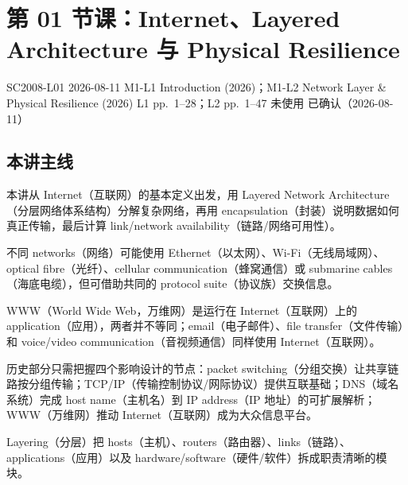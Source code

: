 
\section{第 01 节课：Internet、Layered Architecture 与 Physical Resilience}
\label{lecture:SC2008-L01}

\lecturemeta
  {SC2008-L01}
  {2026-08-11}
  {M1-L1 Introduction (2026)；M1-L2 Network Layer \& Physical Resilience (2026)}
  {L1 pp.~1--28；L2 pp.~1--47}
  {未使用}
  {已确认（2026-08-11）}

\subsection{本讲主线}

本讲从 Internet（互联网）的基本定义出发，用 Layered Network Architecture（分层网络体系结构）分解复杂网络，再用 encapsulation（封装）说明数据如何真正传输，最后计算 link/network availability（链路/网络可用性）。



不同 networks（网络）可能使用 Ethernet（以太网）、Wi-Fi（无线局域网）、optical fibre（光纤）、cellular communication（蜂窝通信）或 submarine cables（海底电缆），但可借助共同的 protocol suite（协议族）交换信息。

WWW（World Wide Web，万维网）是运行在 Internet（互联网）上的 application（应用），两者并不等同；email（电子邮件）、file transfer（文件传输）和 voice/video communication（音视频通信）同样使用 Internet（互联网）。

历史部分只需把握四个影响设计的节点：packet switching（分组交换）让共享链路按分组传输；TCP/IP（传输控制协议/网际协议）提供互联基础；DNS（域名系统）完成 host name（主机名）到 IP address（IP 地址）的可扩展解析；WWW（万维网）推动 Internet（互联网）成为大众信息平台。


Layering（分层）把 hosts（主机）、routers（路由器）、links（链路）、applications（应用）以及 hardware/software（硬件/软件）拆成职责清晰的模块。

